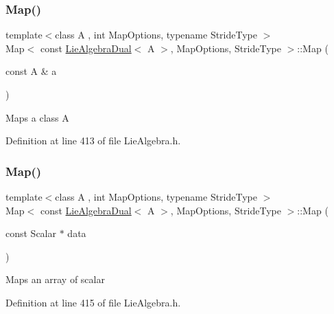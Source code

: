 \subsubsection{\texorpdfstring{Map()}{Map()}\hspace{0.1cm}{\footnotesize\ttfamily [1/3]}}
{\footnotesize\ttfamily template$<$class A , int Map\+Options, typename Stride\+Type $>$ \\
Map$<$ const \hyperlink{class_lie_algebra_dual}{Lie\+Algebra\+Dual}$<$ A $>$, Map\+Options, Stride\+Type $>$\+::Map (\begin{DoxyParamCaption}\item[{const A \&}]{a }\end{DoxyParamCaption})\hspace{0.3cm}{\ttfamily [inline]}}

Maps a class A 

Definition at line 413 of file Lie\+Algebra.\+h.

\hypertarget{class_map_3_01const_01_lie_algebra_dual_3_01_a_01_4_00_01_map_options_00_01_stride_type_01_4_ad7a17fb9ef97f7c0dcd412cb97625a88}{}\label{class_map_3_01const_01_lie_algebra_dual_3_01_a_01_4_00_01_map_options_00_01_stride_type_01_4_ad7a17fb9ef97f7c0dcd412cb97625a88} 
\subsubsection{\texorpdfstring{Map()}{Map()}\hspace{0.1cm}{\footnotesize\ttfamily [2/3]}}
{\footnotesize\ttfamily template$<$class A , int Map\+Options, typename Stride\+Type $>$ \\
Map$<$ const \hyperlink{class_lie_algebra_dual}{Lie\+Algebra\+Dual}$<$ A $>$, Map\+Options, Stride\+Type $>$\+::Map (\begin{DoxyParamCaption}\item[{const Scalar $\ast$}]{data }\end{DoxyParamCaption})\hspace{0.3cm}{\ttfamily [inline]}}

Maps an array of scalar 

Definition at line 415 of file Lie\+Algebra.\+h.

